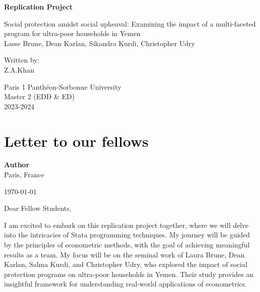 \documentclass{article}
\begin{document}
\pagestyle{fancy}

\begin{titlepage}
    \centering
    \vspace*{1cm}
    
    \huge
    \textbf{Replication Project}

    \vspace{0.5cm}
    \huge
    Social protection amidst social upheaval:
    Examining the impact of a multi-faceted program  
    for ultra-poor households in Yemen\\
    \vspace{1cm}
    \large
    Lasse Brune, Dean Karlan, Sikandra Kurdi, Christopher Udry
    \vspace{2cm}
    
    \Large
    Written by:\\
    \large
    Z.A.Khan\\
    \vfill

    \Large
    Paris 1 Panthéon-Sorbonne University\\
    Master 2  (EDD \& ED)\\
    \vspace{0.8cm}
    \Large
    2023-2024
\end{titlepage}


\newpage
\section*{Letter to our fellows}
\noindent
\textbf{Author}\\
Paris, France\\
\vspace{0.5cm}

\noindent
\today\\
\vspace{0.5cm}


\noindent
Dear Fellow Students,\\
\vspace{0.5cm}


I am excited to embark on this replication project together, where we will delve into the intricacies of Stata programming techniques. My journey will be guided by the principles of econometric methods, with the goal of achieving meaningful results as a team.
My focus will be on the seminal work of Laura Brune, Dean Karlan, Salma Kurdi, and Christopher Udry, who explored the impact of social protection programs on ultra-poor households in Yemen. Their study provides an insightful framework for understanding real-world applications of econometrics.\newline
\end{document}

